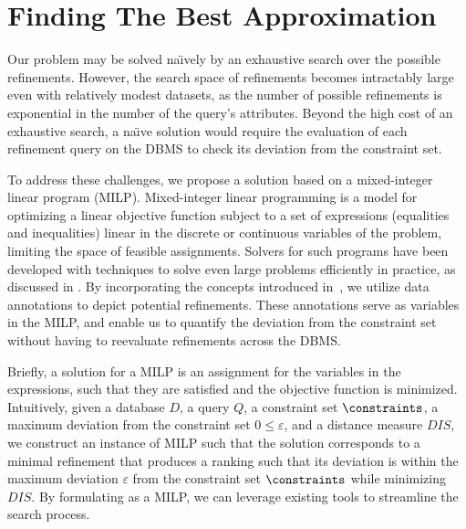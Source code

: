 \section{Finding The Best Approximation}
\label{sec:search}

Our problem may be solved na\"{\i}vely by an exhaustive search over the possible refinements. However, the search space of refinements becomes intractably large even with relatively modest datasets, as the number of possible refinements is exponential in the number of the query's attributes.
Beyond the high cost of an exhaustive search, a na\"{\i}ve solution would require the evaluation of each refinement query on the DBMS to check its deviation from the constraint set. 

To address these challenges, we propose a solution based on a mixed-integer linear program (MILP). Mixed-integer linear programming is a model for optimizing a linear objective function subject to a set of expressions (equalities and inequalities) linear in the discrete or continuous variables of the problem, limiting the space of feasible assignments. Solvers for such programs have been developed with techniques to solve even large problems efficiently in practice, as discussed in \cite{QFix}.
By incorporating the concepts introduced in~\cite{MLJ22, ERICA}, we utilize data annotations to depict potential refinements. These annotations serve as variables in the MILP, and enable us to quantify the deviation from the constraint set without having to reevaluate refinements across the DBMS.

Briefly, a solution for a MILP is an assignment for the variables in the expressions, such that they are satisfied and the objective function is minimized. 
Intuitively, given a database $D$, a query $Q$, a constraint set $\constraints$, a maximum deviation from the constraint set $0 \leq \varepsilon$, and a distance measure $DIS$, we construct an instance of MILP such that the solution corresponds to a minimal refinement that produces a ranking such that its deviation is within the maximum deviation $\varepsilon$ from the constraint set $\constraints$ while minimizing $DIS$.
By formulating \problem{} as a MILP, we can leverage existing tools to streamline the search process. 


